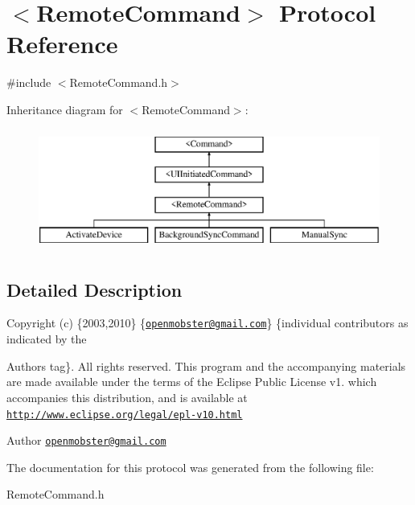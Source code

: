 \hypertarget{protocol_remote_command-p}{
\section{$<$\-Remote\-Command$>$ \-Protocol \-Reference}
\label{protocol_remote_command-p}
}


{\ttfamily \#include $<$\-Remote\-Command.\-h$>$}

\-Inheritance diagram for $<$\-Remote\-Command$>$\-:\begin{figure}[H]
\begin{center}
\leavevmode
\includegraphics[height=4.000000cm]{protocol_remote_command-p}
\end{center}
\end{figure}


\subsection{\-Detailed \-Description}
\-Copyright (c) \{2003,2010\} \{\href{mailto:openmobster@gmail.com}{\tt openmobster@gmail.\-com}\} \{individual contributors as indicated by the \begin{DoxyAuthor}{\-Authors}
tag\}. \-All rights reserved. \-This program and the accompanying materials are made available under the terms of the \-Eclipse \-Public \-License v1. which accompanies this distribution, and is available at \href{http://www.eclipse.org/legal/epl-v10.html}{\tt http\-://www.\-eclipse.\-org/legal/epl-\/v10.\-html}
\end{DoxyAuthor}
\begin{DoxyAuthor}{\-Author}
\href{mailto:openmobster@gmail.com}{\tt openmobster@gmail.\-com} 
\end{DoxyAuthor}


\-The documentation for this protocol was generated from the following file\-:\begin{DoxyCompactItemize}
\item 
\-Remote\-Command.\-h\end{DoxyCompactItemize}
